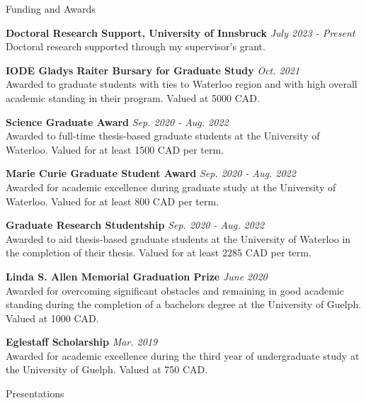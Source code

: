 \documentclass{resume} %
\begin{document}
\begin{rSection}{Funding and Awards}

{\bf Doctoral Research Support, University of Innsbruck}
\hfill\textit{{July 2023 - Present}}\\
Doctoral research supported through my supervisor's grant.

{\bf IODE Gladys Raiter Bursary for Graduate Study}
\hfill\textit{{Oct. 2021}}\\
Awarded to graduate students with ties to Waterloo region and with high overall academic standing in their program. Valued at 5000 CAD.

{\bf Science Graduate Award}
\hfill\textit{{Sep. 2020 - Aug. 2022}}\\
Awarded to full-time thesis-based graduate students at the University of Waterloo. Valued for at least 1500 CAD per term.

{\bf Marie Curie Graduate Student Award}
\hfill\textit{{Sep. 2020 - Aug. 2022}}\\
Awarded for academic excellence during graduate study at the University of Waterloo. Valued for at least 800 CAD per term.

{\bf Graduate Research Studentship}
\hfill\textit{{Sep. 2020 - Aug. 2022}}\\
Awarded to aid thesis-based graduate students at the University of Waterloo in the completion of their thesis. Valued for at least 2285 CAD per term.

{\bf Linda S. Allen Memorial Graduation Prize}
\hfill\textit{{June 2020}}\\
Awarded for overcoming significant obstacles and remaining in good academic standing during the completion of a bachelors degree at the University of Guelph. Valued at 1000 CAD.

{\bf Eglestaff Scholarship}
\hfill\textit{{Mar. 2019}}\\
Awarded for academic excellence during the third year of undergraduate study at the University of Guelph. Valued at 750 CAD.

\end{rSection}

\vspace{1em}

\begin{rSection}{Presentations}



\end{rSection}

\vspace{1em}
\end{document}
